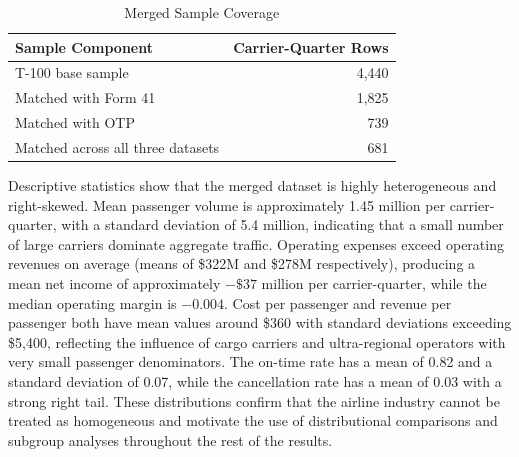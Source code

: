 \documentclass[11pt, letterpaper]{article}
\begin{document}
\begin{table}[H]
\centering
\caption{Merged Sample Coverage}
\label{tab:coverage}
\begin{tabular}{lr}
\toprule
Sample Component & Carrier-Quarter Rows \\
\midrule
T-100 base sample & 4{,}440 \\
Matched with Form 41 & 1{,}825 \\
Matched with OTP & 739 \\
Matched across all three datasets & 681 \\
\bottomrule
\end{tabular}
\end{table}

Descriptive statistics show that the merged dataset is highly heterogeneous and right-skewed. Mean passenger volume is approximately 1.45 million per carrier-quarter, with a standard deviation of 5.4 million, indicating that a small number of large carriers dominate aggregate traffic. Operating expenses exceed operating revenues on average (means of \$322M and \$278M respectively), producing a mean net income of approximately $-\$37$ million per carrier-quarter, while the median operating margin is $-0.004$. Cost per passenger and revenue per passenger both have mean values around \$360 with standard deviations exceeding \$5{,}400, reflecting the influence of cargo carriers and ultra-regional operators with very small passenger denominators. The on-time rate has a mean of 0.82 and a standard deviation of 0.07, while the cancellation rate has a mean of 0.03 with a strong right tail. These distributions confirm that the airline industry cannot be treated as homogeneous and motivate the use of distributional comparisons and subgroup analyses throughout the rest of the results.
\end{document}
